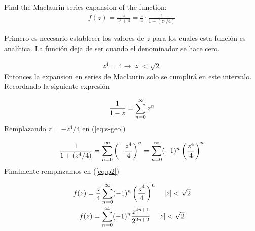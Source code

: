 \begin{problem}{2}
    Find the Maclaurin series expansion of the function:
    \begin{gather}
        \label{eq:p2}f(z) = \frac{z}{z^{4} + 4 } = \frac{z}{4}\cdot\frac{1}{1+ (z^4/4)}
    \end{gather}    
\end{problem}
Primero es necesario establecer los valores de $z$ para los cuales esta función es analítica. La función deja de ser cuando el denominador se hace cero. 

\begin{gather*}
    z^4 = 4 \rightarrow |z| < \sqrt{2}
\end{gather*}
Entonces la expansion en series de Maclaurin solo se cumplirá en este intervalo. Recordando la siguiente expresión 

\begin{gather}
    \label{eq:s-geo}\frac{1}{1 - z} = \sum_{n = 0}^{\infty} z^n
\end{gather}
Remplazando $z = - z^4/4$ en (\ref*{eq:s-geo})

\begin{gather*}
    \frac{1}{1 + (z^4/4)} = \sum_{n = 0}^{\infty} \left(-\frac{z^4}{4}\right)^n = \sum_{n = 0}^{\infty} (-1)^n\left(\frac{z^4}{4}\right)^n
\end{gather*}
Finalmente remplazamos en (\ref*{eq:p2})

\begin{mdframed}
    \vspace{-0.4cm}
    \begin{gather}
        f(z) = \frac{z}{4} \sum_{n = 0}^{\infty} (-1)^n\left(\frac{z^4}{4}\right)^n \;\;\;\; |z| < \sqrt{2}\\
        f(z) = \sum_{n = 0}^{\infty}(-1)^n \frac{z^{4n+1}}{2^{2n+2}} \;\;\;\; |z| < \sqrt{2}
    \end{gather}
\end{mdframed}